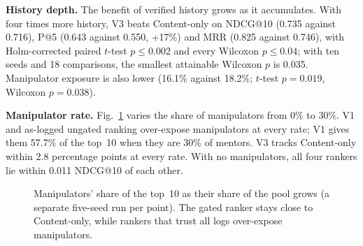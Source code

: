\documentclass[conference]{IEEEtran}
\begin{document}
\textbf{History depth.} The benefit of verified history grows as it accumulates. With four times more history, V3 beats Content-only on NDCG@10 (0.735 against 0.716), P@5 (0.643 against 0.550, +17\%) and MRR (0.825 against 0.746), with Holm-corrected paired $t$-test $p\le0.002$ and every Wilcoxon $p\le0.04$; with ten seeds and 18 comparisons, the smallest attainable Wilcoxon $p$ is 0.035. Manipulator exposure is also lower (16.1\% against 18.2\%; $t$-test $p=0.019$, Wilcoxon $p=0.038$).

\textbf{Manipulator rate.} Fig.~\ref{fig:sweep} varies the share of manipulators from 0\% to 30\%. V1 and as-logged ungated ranking over-expose manipulators at every rate; V1 gives them 57.7\% of the top~10 when they are 30\% of mentors. V3 tracks Content-only within 2.8 percentage points at every rate. With no manipulators, all four rankers lie within 0.011 NDCG@10 of each other.

\begin{figure}[t]
\centering
{}
\caption{Manipulators' share of the top~10 as their share of the pool grows (a separate five-seed run per point). The gated ranker stays close to Content-only, while rankers that trust all logs over-expose manipulators.}
\label{fig:sweep}
\end{figure}
\end{document}

